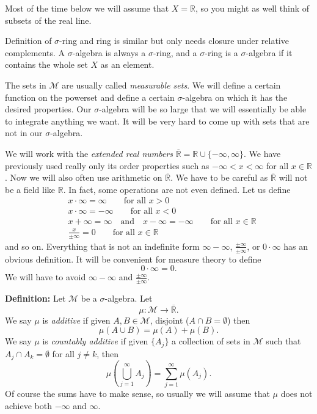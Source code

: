 \documentclass[12pt]{book}
\newcommand{\R}{{\mathbb{R}}}
\newcommand{\sM}{{\mathcal{M}}}
\theoremstyle{plain}
\theoremstyle{remark}
\theoremstyle{definition}
\theoremstyle{exercise}
\theoremstyle{example}
\begin{document}
\medskip

Most of the time below we will assume that $X=\R$, so you might as well
think of subsets of the real line.

\medskip

Definition of $\sigma$-ring and ring is similar but only needs closure under
relative complements.  A $\sigma$-algebra is always a $\sigma$-ring, and a
$\sigma$-ring is a $\sigma$-algebra if it contains the whole
set $X$ as an element.

The sets in $\sM$ are usually called \emph{measurable sets}.  We will define a
certain function on the powerset and define a certain
$\sigma$-algebra on which it has the desired properties.  Our
$\sigma$-algebra will be so large that we will essentially be able to
integrate anything we want.  It will be very hard to come up with sets that
are not in our $\sigma$-algebra.

\medskip

We will work with the \emph{extended real numbers}
$\overline{\R} = \R \cup \{ -\infty, \infty \}$.  We have previously used
really only its order properties such as $-\infty < x < \infty$ for
all $x \in \R$.  Now we will also often use arithmetic on 
$\overline{\R}$.  We have to be careful as
$\overline{\R}$ will not be a field like $\R$.  In fact, some operations are
not even defined.  Let us define
\begin{align*}
& x \cdot \infty = \infty \qquad \text{for all $x > 0$} \\
& x \cdot \infty = -\infty \qquad \text{for all $x < 0$} \\
& x + \infty = \infty \quad \text{and} \quad x - \infty = -\infty \qquad
\text{for all $x \in \R$} \\
&
\frac{x}{\pm\infty} = 0
\qquad \text{for all $x \in \R$}
\end{align*}
and so on.  Everything that is not an indefinite form
$\infty - \infty$, $\frac{\pm \infty}{\pm \infty}$, or $0 \cdot \infty$
has an obvious definition.  It will be convenient for measure theory to define
$$
0 \cdot \infty = 0 .
$$
We will have to avoid $\infty - \infty$ and
$\frac{\pm \infty}{\pm \infty}$.

\medskip

\textbf{Definition:}
Let $\sM$ be a $\sigma$-algebra.  Let
$$
\mu \colon \sM \to \overline{\R} .
$$
We say $\mu$ is \emph{additive} if given $A, B \in \sM$,
disjoint ($A \cap B = \emptyset$) then
$$
\mu ( A \cup B) = \mu (A) + \mu(B) .
$$
We say $\mu$ is \emph{countably additive} if given $\{ A_j \}$ a collection
of sets in $\sM$ such that $A_j \cap A_k = \emptyset$ for all $j\not=k$, then
$$
\mu \left( \bigcup_{j=1}^\infty A_j \right) =
\sum_{j=1}^\infty \mu (A_j) .
$$
Of course the sums have to make sense, so usually we will assume that $\mu$
does not achieve both $-\infty$ and $\infty$.
\end{document}
